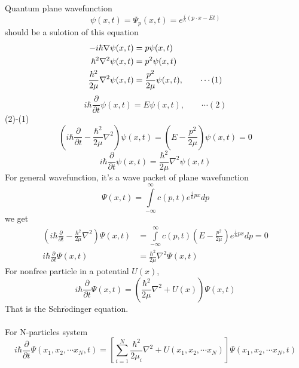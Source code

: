 \begin{frame} [allowframebreaks=]
    \frametitle{}
    \alert{\faHeartbeat} Quantum plane wavefunction \[\psi(x,t)=\Psi_p(x,t)=e^{\frac{i}{\hbar}(p\cdot x-Et)} \]
    should be a sulotion of this equation
    \begin{equation*}
        \begin{split}
       -i\hbar \nabla \psi(x,t) &=p\psi(x,t) \\ \vspace{0.6em}
       \hbar^2 \nabla^2 \psi(x,t) &=p^2\psi(x,t) \\
       \frac{\hbar^2}{2\mu} \nabla^2 \psi(x,t) &=\frac{p^2}{2\mu} \psi(x,t) , \qquad \cdots (1)
        \end{split}
    \end{equation*}
    \begin{equation*}
       i\hbar \frac{\partial }{\partial t} \psi(x,t) =E\psi(x,t)  , \qquad \cdots (2)
     \end{equation*}
    (2)-(1)
    \begin{equation*}
        (i\hbar \frac{\partial }{\partial t} - \frac{\hbar^2}{2\mu} \nabla^2 )\psi(x,t) =(E-\frac{p^2}{2\mu})\psi(x,t)=0  
    \end{equation*}
    \begin{equation*}
        i\hbar \frac{\partial }{\partial t} \psi(x,t) = \frac{\hbar^2}{2\mu} \nabla^2 \psi(x,t)
    \end{equation*}
    For general wavefunction, it's a wave packet of plane wavefunction
    \begin{equation*}
        \Psi(x,t)= \int\limits_{-\infty} ^{\infty} c(p,t) e^{\frac{i}{\hbar}px}dp
    \end{equation*}
    we get 
    \begin{equation*}
        \begin{split}
        (i\hbar \frac{\partial }{\partial t} - \frac{\hbar^2}{2\mu} \nabla^2 )\Psi(x,t) &= \int\limits_{-\infty} ^{\infty} c(p,t) (E-\frac{p^2}{2\mu}) e^{\frac{i}{\hbar}px}dp=0  \\
        i\hbar \frac{\partial }{\partial t} \Psi(x,t) &= \frac{\hbar^2}{2\mu} \nabla^2 \Psi(x,t)
        \end{split}
    \end{equation*}
    For nonfree particle in a potential $U(x)$,
    \begin{equation*}
        \boxed{i\hbar \frac{\partial }{\partial t} \Psi(x,t) = (\frac{\hbar^2}{2\mu} \nabla^2 +U(x)) \Psi(x,t)}
    \end{equation*}
    That is the Schr$\ddot{o}$dinger equation. \\
    ~~\\
    {\Bullet} For N-particles system
   {\small \begin{equation*}
        i\hbar \frac{\partial }{\partial t} \Psi(x_1, x_2, \cdots x_N,t) = [\sum_{i=1} ^{N} \frac{\hbar ^2}{2\mu_i} \nabla^2 +U(x_1, x_2, \cdots x_N)] \Psi(x_1, x_2, \cdots x_N,t)
    \end{equation*}}
\end{frame}

